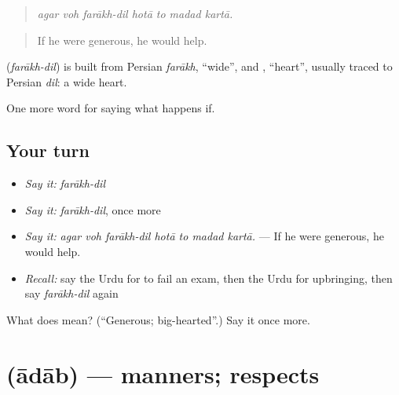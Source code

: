 \begin{quote}
       
\end{quote}

\begin{quote}
\emph{agar voh farākh-dil hotā to madad kartā.}
\end{quote}

\begin{quote}
If he were generous, he would help.
\end{quote}

\begin{cousinweb}
\textbf{ } (\emph{farākh-dil}) is built from Persian \emph{farākh}, \textquotedblleft{}wide\textquotedblright{}, and \textbf{}, \textquotedblleft{}heart\textquotedblright{}, usually traced to Persian \emph{dil}: a wide heart.
\end{cousinweb}

\begin{grammarlens}[title={What you've built}]
One more word for saying what happens if.
\end{grammarlens}

\subsection*{Your turn}
\begin{itemize}
\raggedright
  \item \emph{Say it:} \emph{farākh-dil}
  \item \emph{Say it:} \emph{farākh-dil}, once more
  \item \emph{Say it:} \emph{agar voh farākh-dil hotā to madad kartā.} — If he were generous, he would help.
  \item \emph{Recall:} say the Urdu for to fail an exam, then the Urdu for upbringing, then say \emph{farākh-dil} again
\end{itemize}

\begin{tcolorbox}[breakable,colback=teal!4,colframe=teal!35!black,title={Before you move on}]
What does   mean? (\textquotedblleft{}Generous; big-hearted\textquotedblright{}.) Say it once more.
\end{tcolorbox}
\section[\texorpdfstring{\ur{آداب} (ādāb)}{آداب (ādāb)}]{ (ādāb) — manners; respects}

